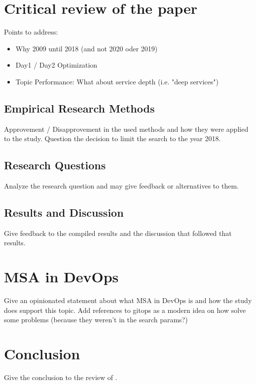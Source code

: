 

\section{Critical review of the paper}

Points to address:
\begin{itemize}
    \item Why 2009 until 2018 (and not 2020 oder 2019)
    \item Day1 / Day2 Optimization
    \item Topic Performance: What about service depth (i.e. "deep services")
\end{itemize}


\subsection{Empirical Research Methods}

Approvement / Disapprovement in the used methods and how they were applied to
the study. Question the decision to limit the search to the year 2018.

\subsection{Research Questions}

Analyze the research question and may give feedback or alternatives to them.

\subsection{Results and Discussion}

Give feedback to the compiled results and the discussion that followed
that results.

\section{MSA in DevOps}

Give an opinionated statement about what MSA in DevOps is and how the study
does support this topic.
Add references to gitops as a modern idea on how solve some problems (because
they weren't in the search params?)



\section{Conclusion}

Give the conclusion to the review of \cite{waseem:SMSMSADevOps}.
